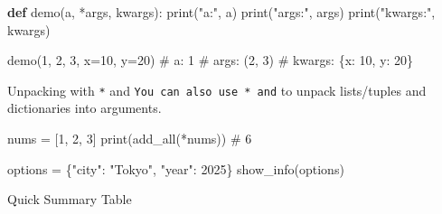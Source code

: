 \documentclass[
  letterpaper,
  DIV=11,
  numbers=noendperiod]{scrreprt}
\newenvironment{Shaded}{\begin{snugshade}}{\end{snugshade}}
\newcommand{\BuiltInTok}[1]{\textcolor[rgb]{0.00,0.23,0.31}{#1}}
\newcommand{\CommentTok}[1]{\textcolor[rgb]{0.37,0.37,0.37}{#1}}
\newcommand{\DecValTok}[1]{\textcolor[rgb]{0.68,0.00,0.00}{#1}}
\newcommand{\KeywordTok}[1]{\textcolor[rgb]{0.00,0.23,0.31}{\textbf{#1}}}
\newcommand{\NormalTok}[1]{\textcolor[rgb]{0.00,0.23,0.31}{#1}}
\newcommand{\OperatorTok}[1]{\textcolor[rgb]{0.37,0.37,0.37}{#1}}
\newcommand{\StringTok}[1]{\textcolor[rgb]{0.13,0.47,0.30}{#1}}
\begin{document}
\begin{Shaded}
\begin{Highlighting}[]
\KeywordTok{def}\NormalTok{ demo(a, }\OperatorTok{*}\NormalTok{args, kwargs):}
    \BuiltInTok{print}\NormalTok{(}\StringTok{"a:"}\NormalTok{, a)}
    \BuiltInTok{print}\NormalTok{(}\StringTok{"args:"}\NormalTok{, args)}
    \BuiltInTok{print}\NormalTok{(}\StringTok{"kwargs:"}\NormalTok{, kwargs)}

\NormalTok{demo(}\DecValTok{1}\NormalTok{, }\DecValTok{2}\NormalTok{, }\DecValTok{3}\NormalTok{, x}\OperatorTok{=}\DecValTok{10}\NormalTok{, y}\OperatorTok{=}\DecValTok{20}\NormalTok{)}
\CommentTok{\# a: 1}
\CommentTok{\# args: (2, 3)}
\CommentTok{\# kwargs: \{\textquotesingle{}x\textquotesingle{}: 10, \textquotesingle{}y\textquotesingle{}: 20\}}
\end{Highlighting}
\end{Shaded}

Unpacking with \texttt{*} and
\texttt{You\ can\ also\ use\ \textasciigrave{}*\textasciigrave{}\ and}
to unpack lists/tuples and dictionaries into arguments.

\begin{Shaded}
\begin{Highlighting}[]
\NormalTok{nums }\OperatorTok{=}\NormalTok{ [}\DecValTok{1}\NormalTok{, }\DecValTok{2}\NormalTok{, }\DecValTok{3}\NormalTok{]}
\BuiltInTok{print}\NormalTok{(add\_all(}\OperatorTok{*}\NormalTok{nums))   }\CommentTok{\# 6}

\NormalTok{options }\OperatorTok{=}\NormalTok{ \{}\StringTok{"city"}\NormalTok{: }\StringTok{"Tokyo"}\NormalTok{, }\StringTok{"year"}\NormalTok{: }\DecValTok{2025}\NormalTok{\}}
\NormalTok{show\_info(options)}
\end{Highlighting}
\end{Shaded}

Quick Summary Table
\end{document}
